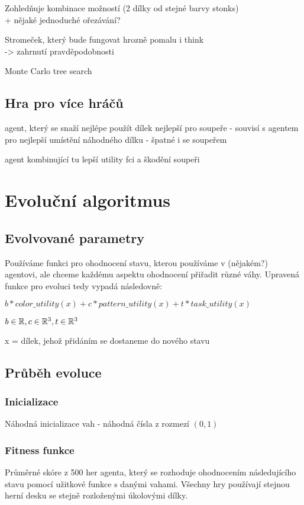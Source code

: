 \vspace{10pt}

Zohledňuje kombinace možností (2 dílky od stejné barvy stonks)\\
+ nějaké jednoduché ořezávání?


Stromeček, který bude fungovat hrozně pomalu i think\\
-> zahrnutí pravděpodobnosti

Monte Carlo tree search

\subsection{Hra pro více hráčů}

agent, který se snaží nejlépe použít dílek nejlepší pro soupeře - souvisí s agentem pro nejlepší umístění náhodného dílku - špatné i se soupeřem

agent kombinující tu lepší utility fci a škodění soupeři

\section{Evoluční algoritmus}
\subsection{Evolvované parametry}

Používáme funkci pro ohodnocení stavu, kterou používáme v (nějakém?) agentovi, ale chceme každému aspektu ohodnocení přiřadit různé váhy. Upravená funkce pro evoluci tedy vypadá následovně:

$b*color\_utility(x) + c*pattern\_utility(x) + t*task\_utility(x)$ 

$b \in \Bbb{R}, c \in \Bbb{R}^3, t \in \Bbb{R}^3$

x = dílek, jehož přidáním se dostaneme do nového stavu

\subsection{Průběh evoluce}

\subsubsection*{Inicializace}
Náhodná inicializace vah - náhodná čísla z rozmezí $(0,1)$
\subsubsection*{Fitness funkce}
Průměrné skóre z 500 her agenta, který se rozhoduje ohodnocením následujícího stavu pomocí užitkové funkce s danými vahami. Všechny hry používají stejnou herní desku se stejně rozloženými úkolovými dílky.
